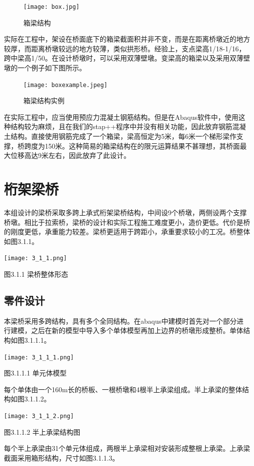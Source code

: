 \documentclass[forprint]{WHUBachelor}
\begin{document}
\begin{figure}[H]
\centering  
\texttt{[image: box.jpg]} 
\caption{箱梁结构} 
\label{3-1} 
\end{figure}

实际在工程中，架设在桥面底下的箱梁截面积并非不变，而是在距离桥墩近的地方较厚，而距离桥墩较远的地方较薄，类似拱形桥。经验上，支点梁高1/18-1/16，跨中梁高1/50。在设计桥墩时，可以采用双薄壁墩。变梁高的箱梁以及采用双薄壁墩的一个例子如下图所示。

\begin{figure}[H]
\centering  
\texttt{[image: boxexample.jpeg]} 
\caption{箱梁结构实例} 
\label{3-1} 
\end{figure}

在实际工程中，应当使用预应力混凝土钢筋结构。但是在Abaqus软件中，使用这种结构较为麻烦，且在我们的stap++程序中并没有相关功能，因此放弃钢筋混凝土结构。直接使用钢筋完成了一个箱梁，梁高恒定为5米，每6米一个梯形梁作支撑，桥跨度为150米。这种简易的箱梁结构在的限元运算结果不甚理想，其桥面最大位移高达9米左右，因此放弃了此设计。

\section{桁架梁桥}

本组设计的梁桥采取多跨上承式桁架梁桥结构，中间设9个桥墩，两侧设两个支撑桥墩。相比于拉索桥，梁桥的设计和实际工程施工难度更小，造价更低。代价是桥的刚度更低，承重能力较差。梁桥更适用于跨距小，承重要求较小的工况。桥整体如图3.1.1。

\texttt{[image: 3\_1\_1.png]}

图3.1.1 梁桥整体形态

\subsection{零件设计}

本梁桥采用多跨结构，具有多个全同结构。在abaqus中建模时首先对一个部分进行建模，之后在新的模型中导入多个单体模型再加上边界的桥墩形成整桥。单体结构如图3.1.1.1。

\texttt{[image: 3\_1\_1\_1.png]}

图3.1.1.1 单元体模型

每个单体由一个160m长的桥板、一根桥墩和4根半上承梁组成。半上承梁的整体结构如图3.1.1.2。

\texttt{[image: 3\_1\_1\_2.png]}

图3.1.1.2 半上承梁结构图

每个半上承梁由31个单元体组成，两根半上承梁相对安装形成整根上承梁。上承梁截面采用箱形结构，尺寸如图3.1.1.3。
\end{document}
